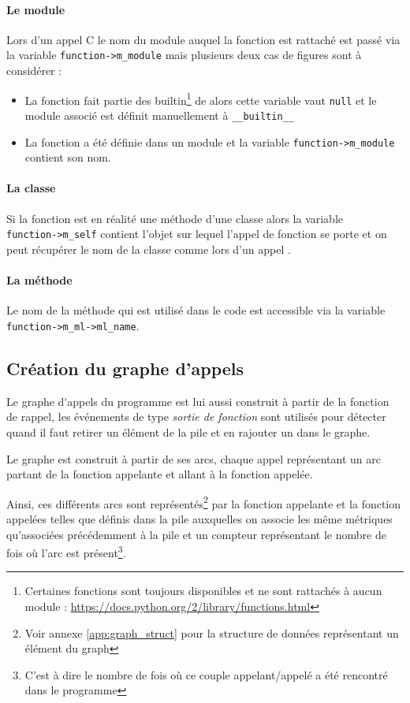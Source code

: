 \paragraph*{Le module} Lors d'un appel C le nom du module auquel la fonction est rattaché est passé via la variable \verb|function->m_module| mais plusieurs deux cas de figures sont à considérer : 
\begin{itemize}
\item La fonction fait partie des builtin\footnote{Certaines fonctions sont toujours disponibles et ne sont rattachés à aucun module : \url{https://docs.python.org/2/library/functions.html}} de \Python alors cette variable vaut \verb|null| et le module associé est définit manuellement à \verb|__builtin__|
\item La fonction a été définie dans un module et la variable \verb|function->m_module| contient son nom.
\end{itemize}

\paragraph*{La classe} Si la fonction est en réalité une méthode d'une classe alors la variable\\ \verb|function->m_self| contient l'objet sur lequel l'appel de fonction se porte et on peut récupérer le nom de la classe comme lors d'un appel \Python.

\paragraph*{La méthode} Le nom de la méthode qui est utilisé dans le code \Python est accessible via la variable \verb|function->m_ml->ml_name|.
  
\subsection{Création du graphe d'appels}
\label{subsec:crea-graph-appel}
Le \gls{graphe d'appels} du programme est lui aussi construit à partir de la fonction de rappel, les événements de type \emph{sortie de fonction} sont utilisés pour détecter quand il faut retirer un élément de la pile et en rajouter un dans le graphe.

Le graphe est construit à partir de ses arcs, chaque appel représentant un arc partant de la fonction appelante et allant à la fonction appelée.

Ainsi, ces différents arcs sont représentés\footnote{Voir annexe \vref{app:graph_struct} pour la structure de données représentant un élément du graph} par la fonction appelante et la fonction appelées telles que définis dans la pile auxquelles on associe les même métriques qu'associées précédemment à la pile et un compteur représentant le nombre de fois où l'arc est présent\footnote{C'est à dire le nombre de fois où ce couple appelant/appelé a été rencontré dans le programme}.

